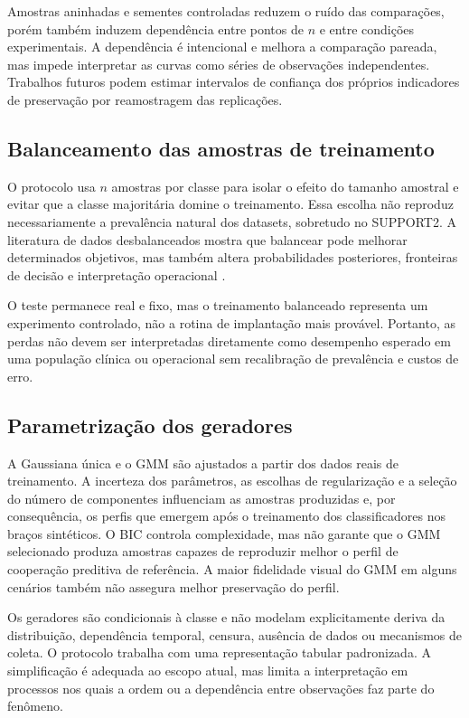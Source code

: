 Amostras aninhadas e sementes controladas reduzem o ruído das comparações, porém também induzem dependência entre pontos de $n$ e entre condições experimentais. A dependência é intencional e melhora a comparação pareada, mas impede interpretar as curvas como séries de observações independentes. Trabalhos futuros podem estimar intervalos de confiança dos próprios indicadores de preservação por reamostragem das replicações.

\subsection{Balanceamento das amostras de treinamento}

O protocolo usa $n$ amostras por classe para isolar o efeito do tamanho amostral e evitar que a classe majoritária domine o treinamento. Essa escolha não reproduz necessariamente a prevalência natural dos datasets, sobretudo no SUPPORT2. A literatura de dados desbalanceados mostra que balancear pode melhorar determinados objetivos, mas também altera probabilidades posteriores, fronteiras de decisão e interpretação operacional \cite{He2009}.

O teste permanece real e fixo, mas o treinamento balanceado representa um experimento controlado, não a rotina de implantação mais provável. Portanto, as perdas não devem ser interpretadas diretamente como desempenho esperado em uma população clínica ou operacional sem recalibração de prevalência e custos de erro.

\subsection{Parametrização dos geradores}

A Gaussiana única e o GMM são ajustados a partir dos dados reais de treinamento. A incerteza dos parâmetros, as escolhas de regularização e a seleção do número de componentes influenciam as amostras produzidas e, por consequência, os perfis que emergem após o treinamento dos classificadores nos braços sintéticos. O BIC controla complexidade, mas não garante que o GMM selecionado produza amostras capazes de reproduzir melhor o perfil de cooperação preditiva de referência. A maior fidelidade visual do GMM em alguns cenários também não assegura melhor preservação do perfil.

Os geradores são condicionais à classe e não modelam explicitamente deriva da distribuição, dependência temporal, censura, ausência de dados ou mecanismos de coleta. O protocolo trabalha com uma representação tabular padronizada. A simplificação é adequada ao escopo atual, mas limita a interpretação em processos nos quais a ordem ou a dependência entre observações faz parte do fenômeno.

